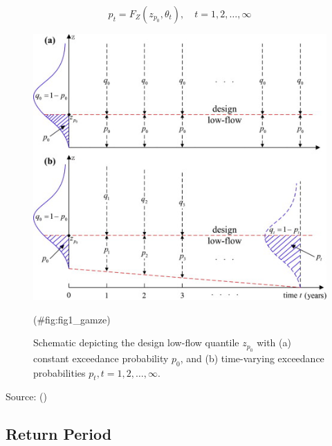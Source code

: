 \documentclass[
]{krantz}
\begin{document}
\[
p_{t}=F_{Z}\left(z_{p_{0}}, {\theta}_{t}\right), \quad t=1,2, \ldots, \infty \tag{5}
\]

\begin{figure}

{\centering \includegraphics[width=0.8\linewidth]{./work/06-lowflow/figures/Figure_1} 

}

\caption{Schematic depicting the design low-flow quantile $z_{p_{0}}$ with (a) constant exceedance probability $p_{0}$, and (b) time-varying exceedance probabilities $p_{t}, t=1,2, \ldots, \infty$.}(\#fig:fig1\_gamze)
\end{figure}

Source: (\citet{Du2015})

\subsection{Return Period}\label{return-period}
\end{document}
